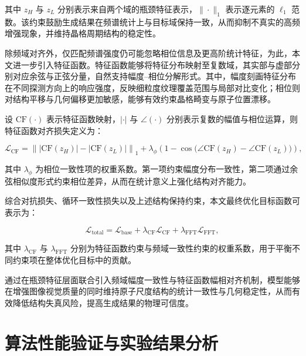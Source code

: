 其中 $z_H$ 与 $z_L$ 分别表示来自两个域的瓶颈特征表示，$\|\cdot\|_1$ 表示逐元素的 $\ell_1$ 范数。该约束鼓励生成结果在频谱统计上与目标域保持一致，从而抑制不真实的高频增强现象，并维持晶格周期结构的稳定性。

除频域对齐外，仅匹配频谱强度仍可能忽略相位信息及更高阶统计特征，为此，本文进一步引入特征函数。特征函数能够将特征分布映射至复数域，其实部与虚部分别对应余弦与正弦分量，自然支持幅度–相位分解形式。其中，幅度刻画特征分布在不同探测方向上的响应强度，反映细粒度纹理覆盖范围与局部对比变化；相位则对结构平移与几何偏移更加敏感，能够有效约束晶格畸变与原子位置漂移。

设 $\mathrm{CF}(\cdot)$ 表示特征函数映射，$|\cdot|$ 与 $\angle(\cdot)$ 分别表示复数的幅值与相位运算，则特征函数对齐损失定义为：

\begin{equation}
\mathcal{L}_{\mathrm{CF}} =
\left\|
\left|
\mathrm{CF}(z_H)
\right|
-
\left|
\mathrm{CF}(z_L)
\right|
\right\|_1
+
\lambda_{\phi}
\left(
1 - \cos
\big(
\angle \mathrm{CF}(z_H)
-
\angle \mathrm{CF}(z_L)
\big)
\right),
\end{equation}

其中 $\lambda_{\phi}$ 为相位一致性项的权重系数。第一项约束幅度分布一致性，第二项通过余弦相似度形式约束相位差异，从而在统计意义上强化结构对齐能力。

综合对抗损失、循环一致性损失以及上述结构保持约束，本文最终优化目标函数可表示为：

\begin{equation}
\mathcal{L}_{\mathrm{total}} =
\mathcal{L}_{\mathrm{base}}
+
\lambda_{\mathrm{CF}} \mathcal{L}_{\mathrm{CF}}
+
\lambda_{\mathrm{FFT}} \mathcal{L}_{\mathrm{FFT}},
\end{equation}

其中 $\lambda_{\mathrm{CF}}$ 与 $\lambda_{\mathrm{FFT}}$ 分别为特征函数约束与频域一致性约束的权重系数，用于平衡不同约束项在整体优化目标中的贡献。

通过在瓶颈特征层面联合引入频域幅度一致性与特征函数幅相对齐机制，模型能够在增强图像视觉质量的同时维持原子尺度结构的统计一致性与几何稳定性，从而有效降低结构失真风险，提高生成结果的物理可信度。

\section{算法性能验证与实验结果分析}


